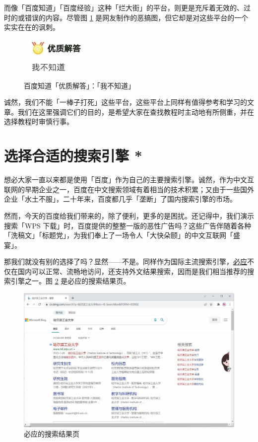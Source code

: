 而像「百度知道」「百度经验」这种「烂大街」的平台，则更是充斥着无效的、过时的或错误的内容。尽管图 \ref{Baidu_zhidao} 是网友制作的恶搞图，但它却是对这些平台的一个实实在在的讽刺。

\begin{figure}[H]
  \centering
  \includegraphics[width=4cm]{assets/Baidu_zhidao.jpg}
  \caption{百度知道「优质解答」：「我不知道」}
  \label{Baidu_zhidao}
\end{figure}

诚然，我们不能「一棒子打死」这些平台，这些平台上同样有值得参考和学习的文章。我们在这里强调它们的目的，是希望大家在查找教程时主动地有所侧重，并在选择教程时审慎行事。

\section{选择合适的搜索引擎 *}

想必大家一直以来都是使用「百度」作为自己的主要搜索引擎。诚然，作为中文互联网的早期企业之一，百度在中文搜索领域有着相当的技术积累；又由于一些国外企业「水土不服」，二十年来，百度都几乎「垄断」了国内搜索引擎的市场。

然而，今天的百度给我们带来的，除了便利，更多的是困扰。还记得中，我们演示搜索「WPS 下载」时，百度提供的整整一版的恶性广告吗？这些广告伴随着各种「洗稿文」「标题党」，为我们奉上了一场令人「大快朵颐」的中文互联网「盛宴」。

那我们就没有别的选择了吗？显然——不是。同样作为国际主流搜索引擎，\href{https://cn.bing.com/}{必应}不仅在国内可以正常、流畅地访问，还支持外文结果搜索，因而是我们相当推荐的搜索引擎之一。图 \ref{Bing_1} 是必应的搜索结果页。

\begin{figure}[htb!]
  \centering
  \includegraphics[width=12cm]{assets/Bing_1.jpg}
  \caption{必应的搜索结果页}
  \label{Bing_1}
\end{figure}

